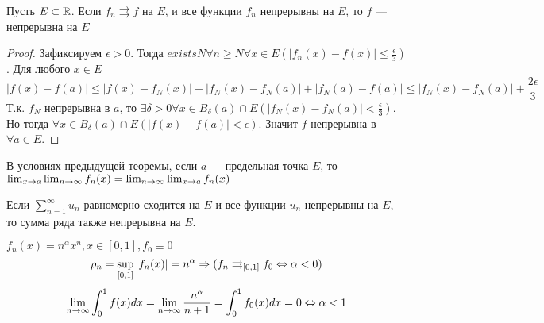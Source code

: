 \begin{theorem}
    Пусть \(E \subset \mathbb{R}\). Если \(f_n \rightrightarrows f\) на \(E\), и все функции \(f_n\) непрерывны на \(E\), то \(f\) --- непрерывна на \(E\)
\end{theorem}
\begin{proof}
    Зафиксируем \(\epsilon > 0\). Тогда \(exists N \forall n \ge N \forall x \in E \left(|f_n(x) - f(x)| \le \frac{\epsilon}{3}\right)\). Для любого \(x \in E\)
    \[|f(x) - f(a)| \le |f(x) - f_N(x)| + |f_N(x) - f_N(a)| + |f_N(a) - f(a)| \le |f_N(x) - f_N(a)| + \frac{2\epsilon}{3}\]
    Т.к. \(f_N\) непрерывна в \(a\), то \(\exists \delta > 0 \forall x \in B_\delta(a) \cap E \left(|f_N(x) - f_N(a)| < \frac{\epsilon}{3}\right)\). Но тогда \(\forall x \in B_\delta(a) \cap E (|f(x) - f(a)| < \epsilon)\). Значит \(f\) непрерывна в \(\forall a \in E\).
\end{proof}

\begin{note}
    В условиях предыдущей теоремы, если \(a\) --- предельная точка \(E\), то \(\lim_{x \rightarrow a}\lim_{n \rightarrow \infty}f_n(x) = \lim_{n \rightarrow \infty}\lim_{x \rightarrow a}f_n(x)\)
\end{note}

\begin{corollary}
    Если \(\sum_{n = 1}^\infty u_n\) равномерно сходится на \(E\) и все функции \(u_n\) непрерывны на \(E\), то сумма ряда также непрерывна на \(E\).
\end{corollary}

\begin{example}
    \(f_n(x) = n^\alpha x^n, x \in [0, 1], f_0 \equiv 0\)
    \[\rho_n = \sup_{[0, 1]}|f_n(x)| = n^\alpha \Rightarrow (f_n \rightrightarrows_{[0, 1]} f_0 \Leftrightarrow \alpha < 0)\]
    \[\lim_{n \rightarrow \infty} \int_0^1 f(x)dx = \lim_{n \rightarrow \infty} \frac{n^\alpha}{n + 1} = \int_0^1 f_0(x)dx = 0 \Leftrightarrow \alpha < 1\]
\end{example}

